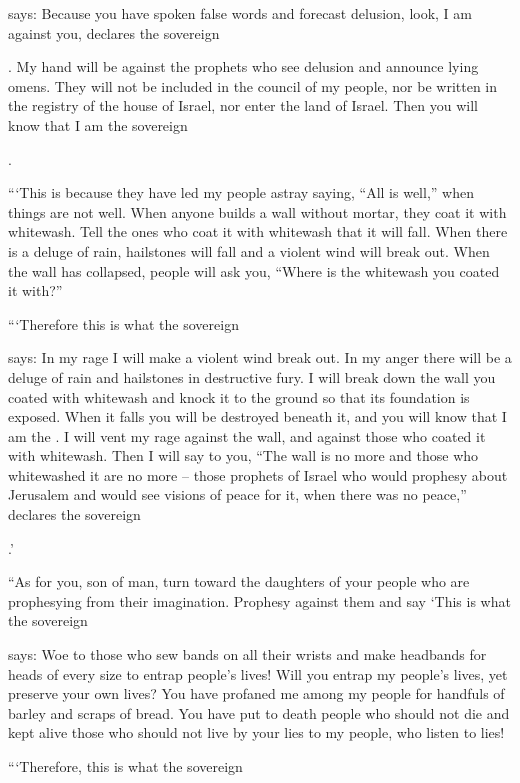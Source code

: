 {{}
says: Because
you have spoken
false
words and forecast
delusion, look,
I am against you, declares
the sovereign

{}.
My hand
will be
against
the prophets
who see
delusion
and announce
lying
omens.
They will not
be included
in the council
of my people,
nor
be written
in the registry
of the house
of Israel,
nor
enter
the land
of Israel.
Then you will know
that
I
am the sovereign

{}.
\par }{\PP {}“‘This
is because
they have led
my people
astray saying,
“All is well,”
when things are not
well.
When anyone
builds
a wall
without mortar, they coat
it with whitewash.
Tell
the ones who coat
it with whitewash
that it will fall.
When
there is a deluge
of rain,
hailstones
will fall
and a violent
wind
will break out.
When the wall
has collapsed,
people will ask
you, “Where
is the whitewash
you coated it with?”
\par }{\PP {}“‘Therefore
this is what
the sovereign

{}
says: In my rage
I will make a violent
wind
break out.
In my anger
there will be
a deluge
of rain
and hailstones
in destructive
fury.
I will break
down the
wall
you coated
with whitewash
and knock
it to
the ground
so that its foundation
is exposed.
When it falls
you will be destroyed
beneath
it, and you will know
that
I am
the {}.
I will vent
my rage
against the wall,
and against those who coated
it with whitewash.
Then I will say
to you, “The wall
is no
more and those who whitewashed
it are no more –
those prophets
of Israel
who would prophesy
about Jerusalem
and would see
visions
of peace
for it, when there was no
peace,”
declares
the sovereign

{}.’
\par }{\PP {}“As for you,
son
of man,
turn
toward
the daughters
of your people
who
are prophesying
from their imagination.
Prophesy
against them
and say
‘This is what
the sovereign

{}
says: Woe
to those who sew
bands
on
all
their wrists
and make
headbands
for heads
of every
size to entrap
people’s lives! Will you entrap
my people’s
lives,
yet preserve
your own lives?
You have profaned
me
among my people
for handfuls
of barley
and scraps
of bread.
You have put to death
people
who
should not
die
and kept alive
those
who
should not
live
by your lies
to my people,
who listen
to lies!
\par }{\PP {}“‘Therefore,
this is what
the sovereign

}
